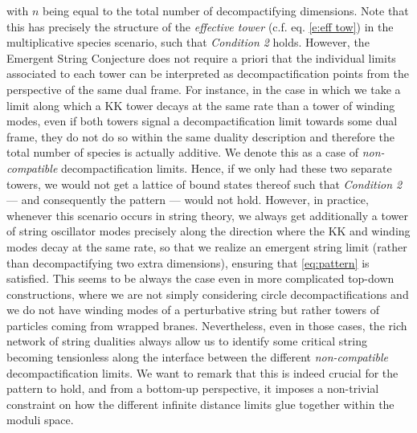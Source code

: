 with $n$ being equal to the total number of decompactifying dimensions. Note that this has precisely the structure of the \emph{effective tower} (c.f. eq. \eqref{e:eff tow}) in the multiplicative species scenario, such that \emph{Condition 2} holds. However, the Emergent String Conjecture does not require a priori that the individual limits associated to each tower can be interpreted as decompactification points from the perspective of the same dual frame. For instance, in the case in which we take a limit along which a KK tower decays at the same rate than a tower of winding modes, even if both towers signal a decompactification limit towards some dual frame, they do not do so within the same duality description and therefore the total number of species is actually additive. We denote this as a case of \emph{non-compatible} decompactification limits. Hence, if we only had these two separate towers, we would not get a lattice of bound states thereof such that \emph{Condition 2} --- and consequently the pattern --- would not hold. However, in practice, whenever this scenario occurs in string theory, we always get additionally a tower of string oscillator modes precisely along the direction where the KK and winding modes decay at the same rate, so that we realize an emergent string limit (rather than decompactifying two extra dimensions), ensuring that \eqref{eq:pattern} is satisfied. This seems to be always the case even in more complicated top-down constructions, where we are not simply considering circle decompactifications and we do not have winding modes of a perturbative string but rather towers of particles coming from wrapped branes. Nevertheless, even in those cases, the rich network of string dualities always allow us to identify some critical string becoming tensionless along the interface between the different  \emph{non-compatible} decompactification limits. We want to remark that this is indeed crucial for the pattern to hold, and from a bottom-up perspective, it imposes a non-trivial constraint on how the different infinite distance limits glue together within the moduli space.
	
